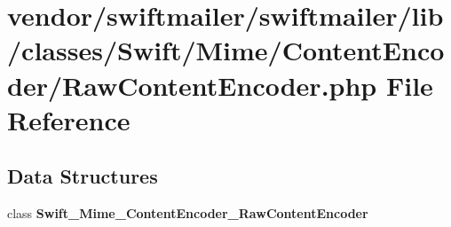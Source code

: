 \section{vendor/swiftmailer/swiftmailer/lib/classes/\+Swift/\+Mime/\+Content\+Encoder/\+Raw\+Content\+Encoder.php File Reference}
\label{_raw_content_encoder_8php}
\subsection*{Data Structures}
\begin{DoxyCompactItemize}
\item 
class {\bf Swift\+\_\+\+Mime\+\_\+\+Content\+Encoder\+\_\+\+Raw\+Content\+Encoder}
\end{DoxyCompactItemize}
